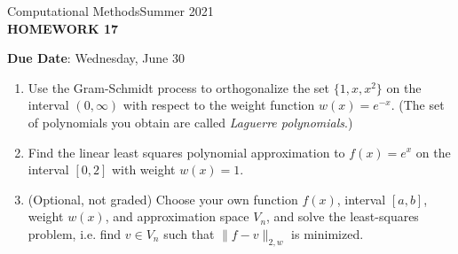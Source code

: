\documentclass[12pt]{article}
\begin{document}
\begin{center}
Computational Methods\qquad Summer 2021
\\

\textbf{\large HOMEWORK 17}\\
\end{center}
\noindent \textbf{Due Date}: Wednesday, June 30\\

\begin{enumerate}
\item Use the Gram-Schmidt process to orthogonalize the set $\{1,x,x^2\}$ on the interval $(0,\infty)$ with respect to the weight function $w(x)=e^{-x}$. (The set of polynomials you obtain are called \emph{Laguerre polynomials}.)
\item Find the linear least squares polynomial approximation to $f(x) = e^x$ on the interval $[0,2]$ with weight $w(x)= 1$.
\item (Optional, not graded) Choose your own function $f(x)$, interval $[a,b]$, weight $w(x)$, and approximation space $V_n$, and solve the least-squares problem, i.e. find $v\in V_n$ such that $\|f-v\|_{2,w}$ is minimized.
\end{enumerate}
\end{document}

